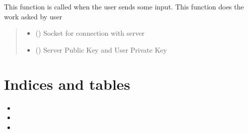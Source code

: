 \documentclass[letterpaper,10pt,english]{sphinxmanual}
\begin{document}
\begin{fulllineitems}
\label{\detokenize{userInputHandler:userInputHandler.handleUserInput}}
\pysigstartsignatures
{}
\pysigstopsignatures
\sphinxAtStartPar
This function is called when the user sends some input. This function does the work asked by user
\begin{quote}\begin{description}
\begin{itemize}
\item {} 
\sphinxAtStartPar
{} () \textendash{} Socket for connection with server

\item {} 
\sphinxAtStartPar
{} () \textendash{} Server Public Key and User Private Key

\end{itemize}

\end{description}\end{quote}

\end{fulllineitems}



\chapter{Indices and tables}
\label{\detokenize{index:indices-and-tables}}\begin{itemize}
\item {} 
\sphinxAtStartPar
{}

\item {} 
\sphinxAtStartPar
{}

\item {} 
\sphinxAtStartPar
{}

\end{itemize}


\renewcommand{\indexname}{Python Module Index}
\begin{sphinxtheindex}
\let\bigletter\sphinxstyleindexlettergroup
\bigletter{a}
\item\relax{}
\indexspace
\bigletter{m}
\item\relax{}
\indexspace
\bigletter{u}
\item\relax{}
\end{sphinxtheindex}

\renewcommand{\indexname}{Index}
\printindex
\end{document}
